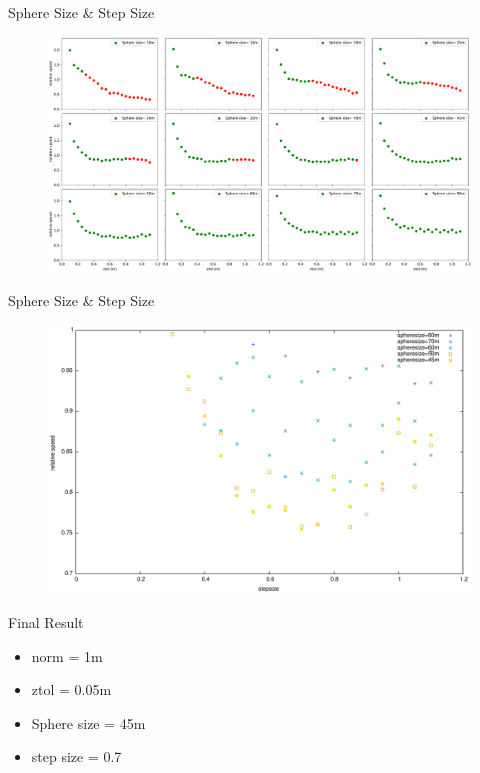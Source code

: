 \documentclass{beamer}
\begin{document}
\begin{frame}{Sphere Size \& Step Size}
	\begin{figure}
		\includegraphics[width=\textwidth]{figures/subplotofallztolsphere.pdf}
	\end{figure}
\end{frame}
\begin{frame}{Sphere Size \& Step Size}
	\begin{figure}
		\includegraphics[width=\textwidth]{figures/SphereAndStepFinal.pdf}
	\end{figure}
\end{frame}
\begin{frame}{Final Result}
	\begin{itemize}
		\item norm = 1m
		\item ztol = 0.05m
		\item Sphere size = 45m
		\item step size = 0.7
	\end{itemize}
\end{frame}
\end{document}

